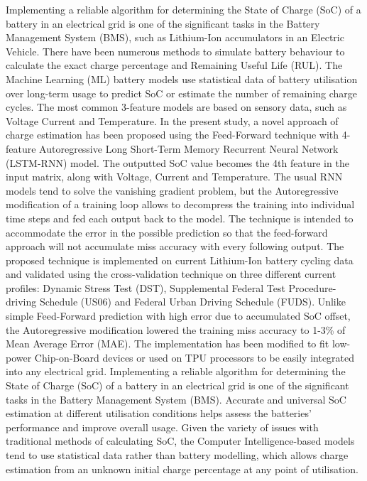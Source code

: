 %
 {
Implementing a reliable algorithm for determining the State of Charge (SoC) of a battery in an electrical grid is one of the significant tasks in the Battery Management System (BMS), such as Lithium-Ion accumulators in an Electric Vehicle.
There have been numerous methods to simulate battery behaviour to calculate the exact charge percentage and Remaining Useful Life (RUL).
The Machine Learning (ML) battery models use statistical data of battery utilisation over long-term usage to predict SoC or estimate the number of remaining charge cycles.
The most common 3-feature models are based on sensory data, such as Voltage Current and Temperature.
In the present study, a novel approach of charge estimation has been proposed using the Feed-Forward technique with 4-feature Autoregressive Long Short-Term Memory Recurrent Neural Network (LSTM-RNN) model.
The outputted SoC value becomes the 4th feature in the input matrix, along with Voltage, Current and Temperature.
The usual RNN models tend to solve the vanishing gradient problem, but the Autoregressive modification of a training loop allows to decompress the training into individual time steps and fed each output back to the model.
The technique is intended to accommodate the error in the possible prediction so that the feed-forward approach will not accumulate miss accuracy with every following output.
The proposed technique is implemented on current Lithium-Ion battery cycling data and validated using the cross-validation technique on three different current profiles: Dynamic Stress Test (DST), Supplemental Federal Test Procedure-driving Schedule (US06) and Federal Urban Driving Schedule (FUDS).
Unlike simple Feed-Forward prediction with high error due to accumulated  SoC offset, the Autoregressive modification lowered the training miss accuracy to 1-3\% of Mean Average Error (MAE).
The implementation has been modified to fit low-power Chip-on-Board devices or used on TPU processors to be easily integrated into any electrical grid.
}{
Implementing a reliable algorithm for determining the State of Charge (SoC) of a battery in an electrical grid is one of the significant tasks in the Battery Management System (BMS).
Accurate and universal SoC estimation at different utilisation conditions helps assess the batteries' performance and improve overall usage.
Given the variety of issues with traditional methods of calculating SoC, the Computer Intelligence-based models tend to use statistical data rather than battery modelling, which allows charge estimation from an unknown initial charge percentage at any point of utilisation.
}
